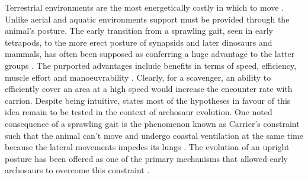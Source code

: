 \documentclass[a4paper,12pt]{article}
\begin{document}
Terrestrial environments are the most energetically costly in which to move \citep{tucker1975energetic}. 
Unlike aerial and aquatic environments support must be provided through the animal's posture. 
The early transition from a sprawling gait, seen in early tetrapods, to the more erect posture of synapsids and later dinosaurs and mammals, has often been supposed as conferring a huge advantage to the latter groups \citep{sullivan2015posture}.
The purported advantages include benefits in terms of speed, efficiency, muscle effort and manoeuvrability \citep{sullivan2015posture}.
Clearly, for a scavenger, an ability to efficiently cover an area at a high speed would increase the encounter rate with carrion. 
Despite being intuitive, \cite{sullivan2015posture} states most of the hypotheses in favour of this idea remain to be tested in the context of archosaur evolution. 
One noted consequence of a sprawling gait is the phenomenon known as Carrier's constraint such that the animal can't move and undergo coastal ventilation at the same time because the lateral movements impedes its lungs \citep{carrier1987evolution}. 
The evolution of an upright posture has been offered as one of the primary mechanisms that allowed early archosaurs to overcome this constraint \citep{uriona2008recruitment}. 
\end{document}
